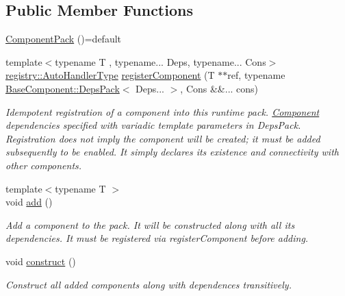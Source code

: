 \subsection*{Public Member Functions}
\begin{DoxyCompactItemize}
\item 
\hyperlink{structvt_1_1runtime_1_1component_1_1_component_pack_a113f2da49d2033f09831b6807c92d330}{Component\+Pack} ()=default
\item 
{\footnotesize template$<$typename T , typename... Deps, typename... Cons$>$ }\\\hyperlink{namespacevt_1_1runtime_1_1component_1_1registry_a9b86518797c7bb91babf0ca8ee7d06e6}{registry\+::\+Auto\+Handler\+Type} \hyperlink{structvt_1_1runtime_1_1component_1_1_component_pack_a956437fba91b2b90576df33276858df5}{register\+Component} (T $\ast$$\ast$ref, typename \hyperlink{structvt_1_1runtime_1_1component_1_1_base_component_1_1_deps_pack}{Base\+Component\+::\+Deps\+Pack}$<$ Deps... $>$, Cons \&\&... cons)
\begin{DoxyCompactList}\small\item\em Idempotent registration of a component into this runtime pack. \hyperlink{structvt_1_1runtime_1_1component_1_1_component}{Component} dependencies specified with variadic template parameters in {\ttfamily Deps\+Pack}. Registration does not imply the component will be created; it must be added subsequently to be enabled. It simply declares its existence and connectivity with other components. \end{DoxyCompactList}\item 
{\footnotesize template$<$typename T $>$ }\\void \hyperlink{structvt_1_1runtime_1_1component_1_1_component_pack_a2be733d29f56456f71352569a898dee5}{add} ()
\begin{DoxyCompactList}\small\item\em Add a component to the pack. It will be constructed along with all its dependencies. It must be registered via {\ttfamily register\+Component} before adding. \end{DoxyCompactList}\item 
void \hyperlink{structvt_1_1runtime_1_1component_1_1_component_pack_ab5f7966f4de3f81643d9945302de7cfa}{construct} ()
\begin{DoxyCompactList}\small\item\em Construct all added components along with dependences transitively. \end{DoxyCompactList}\item 
$$
\end{DoxyCompactItemize}
